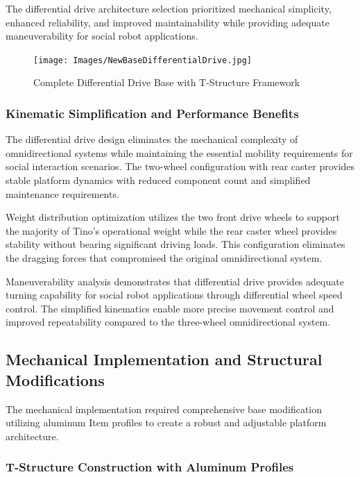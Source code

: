 The differential drive architecture selection prioritized mechanical simplicity, enhanced reliability, and improved maintainability while providing adequate maneuverability for social robot applications.

\begin{figure}[H]
    \centering
    \texttt{[image: Images/NewBaseDifferentialDrive.jpg]}
    \caption{Complete Differential Drive Base with T-Structure Framework}
    \label{fig:differential_base_complete}
\end{figure}

\subsubsection{Kinematic Simplification and Performance Benefits}

The differential drive design eliminates the mechanical complexity of omnidirectional systems while maintaining the essential mobility requirements for social interaction scenarios. The two-wheel configuration with rear caster provides stable platform dynamics with reduced component count and simplified maintenance requirements.

Weight distribution optimization utilizes the two front drive wheels to support the majority of Tino's operational weight while the rear caster wheel provides stability without bearing significant driving loads. This configuration eliminates the dragging forces that compromised the original omnidirectional system.

Maneuverability analysis demonstrates that differential drive provides adequate turning capability for social robot applications through differential wheel speed control. The simplified kinematics enable more precise movement control and improved repeatability compared to the three-wheel omnidirectional system.

\subsection{Mechanical Implementation and Structural Modifications}

The mechanical implementation required comprehensive base modification utilizing aluminum Item profiles to create a robust and adjustable platform architecture.

\subsubsection{T-Structure Construction with Aluminum Profiles}

